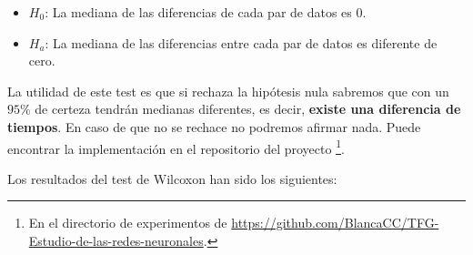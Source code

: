\begin{itemize}
    \item $H_0$: La mediana de las diferencias de cada par de datos es $0$. 
    \item $H_a$: La mediana de las diferencias entre cada par de datos es diferente de cero. 
\end{itemize}

La utilidad de este test es que si rechaza la hipótesis nula sabremos que con un $95 \%$ de certeza tendrán medianas diferentes, es decir, \textbf{existe una 
diferencia de tiempos}. En caso de que no se rechace no podremos afirmar nada.
Puede encontrar la implementación en el repositorio del
 proyecto \footnote{En el directorio de experimentos 
 de \url{https://github.com/BlancaCC/TFG-Estudio-de-las-redes-neuronales}.}.

 Los resultados del test de Wilcoxon han sido los siguientes: 

